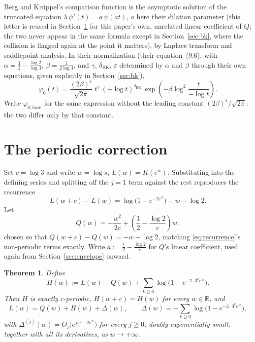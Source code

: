 \documentclass[11pt]{amsart}
\theoremstyle{plain}
\newtheorem{theorem}{Theorem}
\theoremstyle{definition}
\theoremstyle{remark}
\newcommand{\R}{\mathbb{R}}
\begin{document}
Berg and Kr\"uppel's comparison function is the asymptotic solution of the truncated equation
$\lambda\, \psi'(t) = a\,
\psi(at)$, $a$ here their dilation parameter (this letter is reused in Section~\ref{sec:periodic}
for this paper's own, unrelated linear coefficient of $Q$; the two never appear in the same
formula except in Section~\ref{sec:bk}, where the collision is flagged again at the point it
matters), by Laplace transform and saddlepoint analysis. In their normalization (their
equation~(9.6), with
$\alpha = \tfrac12 - \tfrac{\log 2}{\log 3}$, $\beta = \tfrac{1}{2\log 3}$, and $\gamma$,
$\delta_{\mathrm{BK}}$, $\varepsilon$ determined by $\alpha$ and $\beta$ through their own
equations, given explicitly in Section~\ref{sec:bk}),
\[
\varphi_0(t) = \frac{(2\beta)^\varepsilon}{\sqrt{2\pi}}\; t^\gamma\,(-\log t)^{\delta_{\mathrm{BK}}}
\, \exp\!\left(-\beta \log^2\!\frac{t}{-\log t}\right).
\]
Write $\varphi_{0,\mathrm{bare}}$ for the same expression without the leading constant
$(2\beta)^\varepsilon/\sqrt{2\pi}$: the two differ only by that constant.

\section{The periodic correction}
\label{sec:periodic}

Set $c = \log 3$ and write $w = \log s$, $L(w) = K(e^w)$. Substituting into the defining series and
splitting off the $j=1$ term against the rest reproduces the recurrence
\begin{equation}
\label{eq:recurrence}
L(w+c) - L(w) = \log\bigl(1 - e^{-2e^w}\bigr) - w - \log 2.
\end{equation}
Let
\[
Q(w) = -\frac{w^2}{2c} + \left(\frac12 - \frac{\log 2}{c}\right) w,
\]
chosen so that $Q(w+c) - Q(w) = -w-\log2$, matching \eqref{eq:recurrence}'s non-periodic terms
exactly. Write $a := \tfrac12 - \tfrac{\log 2}{c}$ for $Q$'s linear coefficient, used again from
Section~\ref{sec:envelope} onward.

\begin{theorem}
\label{thm:H}
Define
\begin{equation}
\label{eq:Hexact}
H(w) := L(w) - Q(w) + \sum_{k \ge 0} \log\bigl(1 - e^{-2\cdot 3^k e^w}\bigr).
\end{equation}
Then $H$ is exactly $c$-periodic, $H(w+c) = H(w)$ for every $w \in \R$, and
\[
L(w) = Q(w) + H(w) + \Delta(w), \qquad \Delta(w) = -\sum_{k\ge 0}\log\bigl(1-e^{-2\cdot3^k e^w}\bigr),
\]
with $\Delta^{(j)}(w) = O_j\bigl(e^{jw - 2e^w}\bigr)$ for every $j \ge 0$: doubly exponentially
small, together with all its derivatives, as $w \to +\infty$.
\end{theorem}
\end{document}
